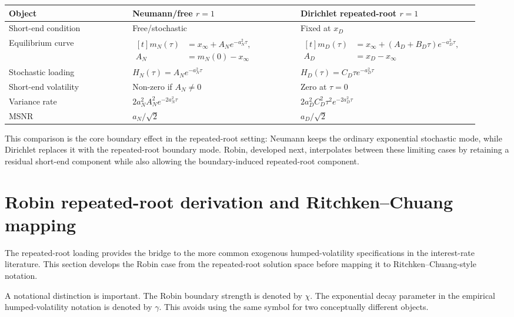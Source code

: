 \documentclass[11pt]{article}
\numberwithin{equation}{section}
\begin{document}
\clearpage
\begin{longtable}{p{0.25\linewidth}p{0.34\linewidth}p{0.34\linewidth}}
\toprule
Object & Neumann/free $r=1$ & Dirichlet repeated-root $r=1$\\
\midrule
Short-end condition & Free/stochastic & Fixed at $x_D$\\
Equilibrium curve & $\begin{aligned}[t]
m_N(\tau)&=x_\infty+A_Ne^{-a_N^2\tau},\\
A_N&=m_N(0)-x_\infty
\end{aligned}$ & $\begin{aligned}[t]
m_D(\tau)&=x_\infty+(A_D+B_D\tau)e^{-a_D^2\tau},\\
A_D&=x_D-x_\infty
\end{aligned}$\\
Stochastic loading & $H_N(\tau)=A_Ne^{-a_N^2\tau}$ & $H_D(\tau)=C_D\tau e^{-a_D^2\tau}$\\
Short-end volatility & Non-zero if $A_N\neq0$ & Zero at $\tau=0$\\
Variance rate & $2a_N^2A_N^2e^{-2a_N^2\tau}$ & $2a_D^2C_D^2\tau^2e^{-2a_D^2\tau}$\\
MSNR & $a_N/\sqrt{2}$ & $a_D/\sqrt{2}$\\
\bottomrule
\end{longtable}

This comparison is the core boundary effect in the repeated-root setting: Neumann keeps the ordinary exponential stochastic mode, while Dirichlet replaces it with the repeated-root boundary mode. Robin, developed next, interpolates between these limiting cases by retaining a residual short-end component while also allowing the boundary-induced repeated-root component.

\section{Robin repeated-root derivation and Ritchken--Chuang mapping}

The repeated-root loading provides the bridge to the more common exogenous humped-volatility specifications in the interest-rate literature. This section develops the Robin case from the repeated-root solution space before mapping it to Ritchken--Chuang-style notation.

A notational distinction is important. The Robin boundary strength is denoted by $\chi$. The exponential decay parameter in the empirical humped-volatility notation is denoted by $\gamma$. This avoids using the same symbol for two conceptually different objects.
\end{document}
